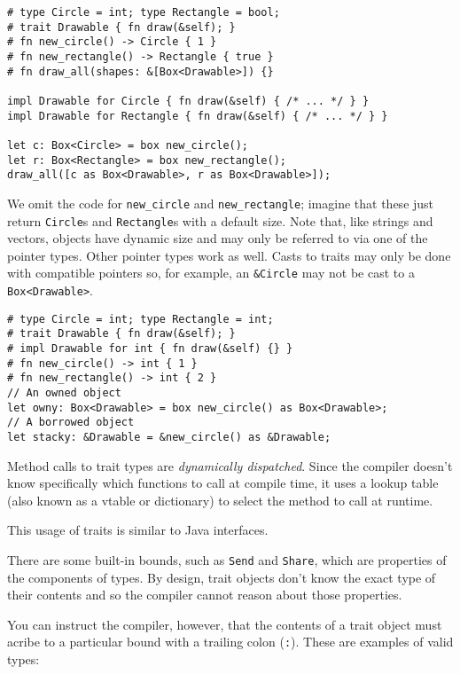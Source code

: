 \documentclass[]{article}
\begin{document}
\begin{verbatim}
# type Circle = int; type Rectangle = bool;
# trait Drawable { fn draw(&self); }
# fn new_circle() -> Circle { 1 }
# fn new_rectangle() -> Rectangle { true }
# fn draw_all(shapes: &[Box<Drawable>]) {}

impl Drawable for Circle { fn draw(&self) { /* ... */ } }
impl Drawable for Rectangle { fn draw(&self) { /* ... */ } }

let c: Box<Circle> = box new_circle();
let r: Box<Rectangle> = box new_rectangle();
draw_all([c as Box<Drawable>, r as Box<Drawable>]);
\end{verbatim}

We omit the code for \texttt{new\_circle} and \texttt{new\_rectangle};
imagine that these just return \texttt{Circle}s and \texttt{Rectangle}s
with a default size. Note that, like strings and vectors, objects have
dynamic size and may only be referred to via one of the pointer types.
Other pointer types work as well. Casts to traits may only be done with
compatible pointers so, for example, an \texttt{\&Circle} may not be
cast to a \texttt{Box\textless{}Drawable\textgreater{}}.

\begin{verbatim}
# type Circle = int; type Rectangle = int;
# trait Drawable { fn draw(&self); }
# impl Drawable for int { fn draw(&self) {} }
# fn new_circle() -> int { 1 }
# fn new_rectangle() -> int { 2 }
// An owned object
let owny: Box<Drawable> = box new_circle() as Box<Drawable>;
// A borrowed object
let stacky: &Drawable = &new_circle() as &Drawable;
\end{verbatim}

Method calls to trait types are \emph{dynamically dispatched}. Since the
compiler doesn't know specifically which functions to call at compile
time, it uses a lookup table (also known as a vtable or dictionary) to
select the method to call at runtime.

This usage of traits is similar to Java interfaces.

There are some built-in bounds, such as \texttt{Send} and
\texttt{Share}, which are properties of the components of types. By
design, trait objects don't know the exact type of their contents and so
the compiler cannot reason about those properties.

You can instruct the compiler, however, that the contents of a trait
object must acribe to a particular bound with a trailing colon
(\texttt{:}). These are examples of valid types:
\end{document}

